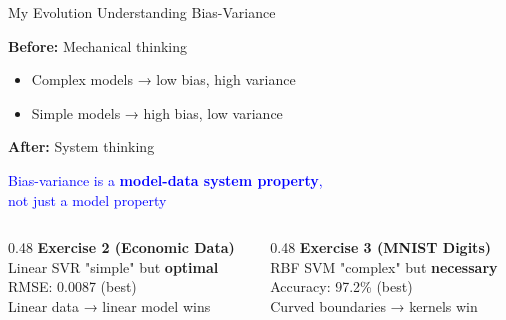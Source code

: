 \documentclass[aspectratio=169]{beamer}
\begin{document}
\begin{frame}{My Evolution Understanding Bias-Variance}

\textbf{Before:} Mechanical thinking
\begin{itemize}
\item Complex models → low bias, high variance
\item Simple models → high bias, low variance
\end{itemize}

\vspace{0.5cm}
\textbf{After:} System thinking

\begin{center}
\Large
\textcolor{blue}{Bias-variance is a \textbf{model-data system property},\\
not just a model property}
\end{center}

\vspace{0.3cm}
\begin{columns}[T]
\begin{column}{0.48\textwidth}
\textbf{Exercise 2 (Economic Data)}\\
Linear SVR "simple" but \textbf{optimal}\\
RMSE: 0.0087 (best)\\
\small{Linear data → linear model wins}
\end{column}

\begin{column}{0.48\textwidth}
\textbf{Exercise 3 (MNIST Digits)}\\
RBF SVM "complex" but \textbf{necessary}\\
Accuracy: 97.2\% (best)\\
\small{Curved boundaries → kernels win}
\end{column}
\end{columns}

\end{frame}
\end{document}
